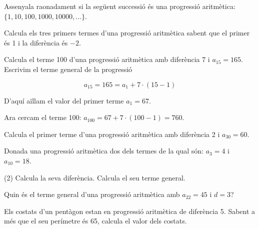  
\begin{mylist}

\exer \spen Assenyala raonadament si la següent successió és una progressió aritmètica: $\{1, 10, 100, 1000, 10000, {\dots}\}$.
\vso
{}

\exer  Calcula els tres primers termes d'una progressió aritmètica sabent que el primer és 1 i la diferència és $-2$.
\vso
{}

\begin{resolt}[E]{
		 Calcula el terme 100 \linebreak d'una progressió aritmètica amb diferència 7 i $a_{15} = 165$. 
	}
	Escrivim el terme general de la progressió 
	
	\[a_{15} = 165 = a_1 + 7 \cdot (15 -1)\]
	
	 D'aquí aïllam el valor del primer terme $a_1 = 67$. 
	\vspace{0.25cm}
	
	Ara cercam el terme 100: $a_{100} = 67  + 7 \cdot (100 -1) =760$.
\end{resolt}
 
\exer  Calcula el primer terme d'una progressió aritmètica amb diferència 2 i $a_{30} = 60$. 

\exer  Donada una progressió aritmètica dos dels termes de la qual són: $a_{3} = 4$ i $a_{10} = 18$.

\begin{tasks}(2)
 \task Calcula la seva diferència.
 \task Calcula el seu terme general.
\end{tasks}
\answers[cols=1]{[La diferència és $d=(18-4)/(10-3)=2$, Necessitam el primer terme: $a_1=0$ El terme general és $a_n=0+2\cdot (n-1)$. Efectivament comprovam que $a_{10}=18$]}


\exer  Quin és el terme general d'una progressió aritmètica amb $a_{22} = 45$ i $d = 3$?

\exer  Els costats d'un pentàgon estan en progressió aritmètica de diferència 5. Sabent a més que el seu perímetre és 65, calcula el valor dels costats.


\end{mylist}
